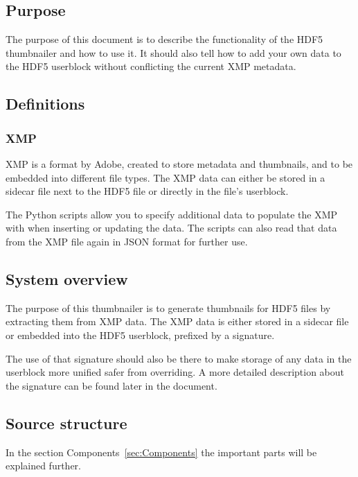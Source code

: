 \subsection{Purpose}

The purpose of this document is to describe the functionality of the HDF5 thumbnailer and how to use it.
It should also tell how to add your own data to the HDF5 userblock without conflicting the current XMP metadata.

\subsection{Definitions}

\subsubsection{XMP}
XMP is a format by Adobe, created to store metadata and thumbnails, and to be embedded into different file types.
The XMP data can either be stored in a sidecar file next to the HDF5 file or directly in the file's userblock.

The Python scripts allow you to specify additional data to populate the XMP with when inserting or updating the data.
The scripts can also read that data from the XMP file again in JSON format for further use.

\subsection{System overview}
The purpose of this thumbnailer is to generate thumbnails for HDF5 files by extracting them from XMP data.
The XMP data is either stored in a sidecar file or embedded into the HDF5 userblock, prefixed by a signature.

The use of that signature should also be there to make storage of any data in the userblock more unified safer from overriding.
A more detailed description about the signature can be found later in the document.

\newpage
\subsection{Source structure}

In the section Components~\ref{sec:Components} the important parts will be explained further.
